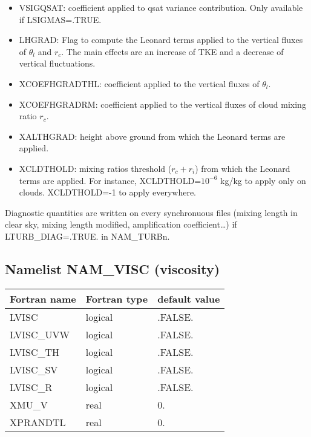 \begin{itemize}
\item
{}
VSIGQSAT: coefficient applied to qsat variance contribution. Only available if LSIGMAS=.TRUE.

\item
{}
LHGRAD: Flag to compute the Leonard terms applied to the vertical fluxes of $\theta_l$ and $r_c$. The main effects are an increase of TKE and a decrease of vertical fluctuations.

\item
{}
XCOEFHGRADTHL: coefficient applied to the vertical fluxes of $\theta_l$.

\item
{}
XCOEFHGRADRM: coefficient applied to the vertical fluxes of cloud mixing ratio $r_c$.

\item
{}
XALTHGRAD: height above ground from which the Leonard terms are applied.

\item
{}
XCLDTHOLD: mixing ratios threshold ($r_c + r_i$) from which the Leonard terms are applied. For instance, XCLDTHOLD=$10^{-6}$ kg/kg to apply only on clouds. XCLDTHOLD=-1 to apply everywhere.

\end{itemize}

Diagnostic quantities are written on every synchronuous files 
(mixing length in clear sky, mixing length modified, amplification coefficient\ldots) if LTURB\_DIAG=.TRUE. in NAM\_TURBn.
\subsection{Namelist NAM\_VISC (viscosity)}
\begin{center}
\begin{tabular}{|l|l|l| }
\hline 
 Fortran name  & Fortran type  & default value \\
\hline
 LVISC & logical       & .FALSE.           \\
 LVISC\_UVW & logical       & .FALSE.           \\
 LVISC\_TH & logical       & .FALSE.           \\
 LVISC\_SV & logical       & .FALSE.           \\
 LVISC\_R & logical       & .FALSE.           \\
 XMU\_V & real       & 0.           \\
 XPRANDTL & real       & 0.           \\
\hline
\end{tabular}
\end{center}

